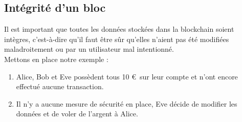 \documentclass[12pt, a4paper, oneside]{book}
\begin{document}
    \subsection{Intégrité d'un bloc}
    Il est important que toutes les données stockées dans la blockchain soient intègres, c’est-à-dire qu’il faut être sûr qu’elles n’aient pas été modifiées maladroitement ou par un utilisateur mal intentionné.
    \\
    Mettons en place notre exemple :

    \begin{enumerate}
        \item Alice, Bob et Eve possèdent tous 10 \euro~sur leur compte et n’ont encore effectué aucune transaction.
        \item Il n'y a aucune mesure de sécurité en place, Eve décide de modifier les données et de voler de l’argent à Alice. 
        \newline
    \end{enumerate} 
\end{document}
